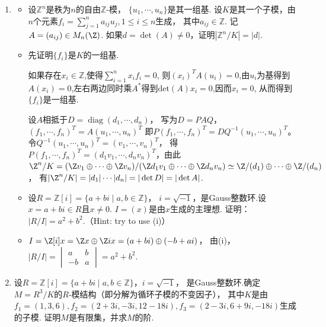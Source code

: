 \begin{enumerate}
    \item[3.3]
    \begin{itemize}
        \item[(i)]设$\mathbb{Z}^n$是秩为$n$的自由$\mathbb{Z}$-模，
        $\{u_1,\cdots,u_n\}$是其一组基.
        设$K$是其一个子模，由$n$个元素$f_i=\sum_{j=1}^na_{ij}u_j,1\leq i\leq n$生成，
        其中$a_{ij}\in\mathbb{Z}$. 记$A=(a_{ij})\in M_n(\Z)$.
        如果$d=\det(A)\neq0$，证明$|\mathbb{Z}^n/K|=|d|$.
        \item[\textbf{证明:}]
        先证明$\{f_i\}$是$K$的一组基.

        如果存在$x_i\in \mathbb{Z}$,使得$\sum_{i=1}^n x_i f_i = 0$,
        则$(x_i)^T A (u_i) = 0$,由$u_i$为基得到$A(x_i) = 0$,左右两边同时乘$A^*$得到$\mathrm{det}(A) x_i = 0$,因而$x_i = 0$,
        从而得到$\{f_i\}$是一组基.
         
        设$A$相抵于$D=\operatorname{diag}(d_1,\cdots,d_n)$，
        写为$D=PAQ$，$(f_1,\cdots,f_n)^T=A(u_1,\cdots,u_n)^T$
        即$P(f_1,\cdots,f_n)^T=DQ^{-1}(u_1,\cdots,u_n)^T$。
        令$Q^{-1}(u_1,\cdots,u_n)^T=(v_1,\cdots,v_n)^T$，
        得$P(f_1,\cdots,f_n)^T=(d_1v_1,\cdots,d_nv_n)^T$，由此
        $\Z^n/K=(\Z v_1\oplus\cdots\oplus\Z v_n)
        /(\Z d_1v_1\oplus\cdots\oplus\Z d_nv_n)
        \simeq\Z/(d_1)\oplus\cdots\oplus\Z/(d_n)$，
        有$|\Z^n/K|=|d_1|\cdots|d_n|=|\det D|=|\det A|$.

        \item[(ii)]设$R=\mathbb{Z}[i]=\{a+bi\mid a,b\in\mathbb{Z}\}$，
        $i=\sqrt{-1}$，是Gauss整数环.设$x=a+bi\in R$且$x\neq0$. 
        $I=(x)$是由$x$生成的主理想. 证明：$|R/I|=a^2+b^2$.（Hint: try to use (i)）
        \item[\textbf{证明:}]
        $I=\Z[i]x=\Z x\oplus\Z ix=(a+bi)\oplus(-b+ai)$，
        由(i)，$|R/I|=\begin{vmatrix}a&b\\-b&a\end{vmatrix}=a^2+b^2$.
    \end{itemize}

    \item[3.4]
    设$R=\mathbb{Z}[i]=\{a+bi\mid a,b\in\mathbb{Z}\}$，$i=\sqrt{-1}$，
    是Gauss整数环.确定$M=R^3/K$的$R$-模结构（即分解为循环子模的不变因子），
    其中$K$是由$f_1=(1,3,6),f_2=(2+3i,-3i,12-18i),f_3=(2-3i,6+9i,-18i)$生成的子模.
    证明$M$是有限集，并求$M$的阶.


\end{enumerate}
